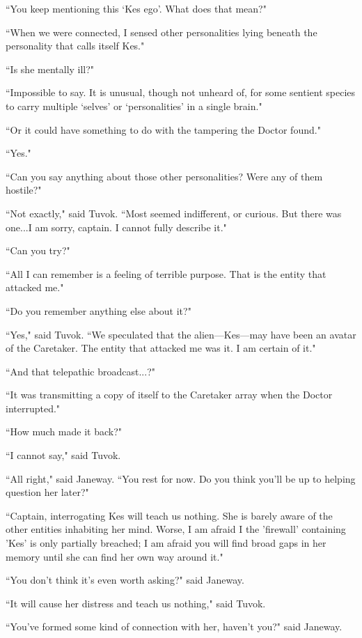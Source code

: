 \documentclass[twoside,letterpaper,12pt]{memoir}
\begin{document}
``You keep mentioning this `Kes ego'. What does that mean?" 

``When we were connected, I sensed other personalities lying beneath the personality that calls itself Kes." 

``Is she mentally ill?" 

``Impossible to say. It is unusual, though not unheard of, for some sentient species to carry multiple `selves' or `personalities' in a single brain." 

``Or it could have something to do with the tampering the Doctor found." 

``Yes." 

``Can you say anything about those other personalities? Were any of them hostile?" 

``Not exactly," said Tuvok. ``Most seemed indifferent, or curious. But there was one...I am sorry, captain. I cannot fully describe it." 

``Can you try?" 

``All I can remember is a feeling of terrible purpose. That is the entity that attacked me." 

``Do you remember anything else about it?" 

``Yes," said Tuvok. ``We speculated that the alien---Kes---may have been an avatar of the Caretaker. The entity that attacked me was it. I am certain of it." 

``And that telepathic broadcast...?" 

``It was transmitting a copy of itself to the Caretaker array when the Doctor interrupted." 

``How much made it back?" 

``I cannot say," said Tuvok. 

``All right," said Janeway. ``You rest for now. Do you think you'll be up to helping question her later?" 

``Captain, interrogating Kes will teach us nothing. She is barely aware of the other entities inhabiting her mind. Worse, I am afraid I the 'firewall' containing 'Kes' is only partially breached; I am afraid you will find broad gaps in her memory until she can find her own way around it." 

``You don't think it's even worth asking?" said Janeway. 

``It will cause her distress and teach us nothing," said Tuvok. 

``You've formed some kind of connection with her, haven't you?" said Janeway. 
\end{document}
